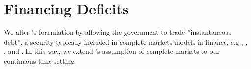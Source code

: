 \documentclass[12pt]{article}
\newcommand{\WJ}[1]{{\textcolor{red}{#1}}}
\newcommand{\TS}[1]{{\textcolor{magenta}{#1}}}
\begin{document}







\section{Financing Deficits}\label{sec:financing}

We alter \citeauthor{LucasStokey1983}'s formulation by 
allowing the government
to trade  ''instantaneous debt'', a security typically  included  in complete markets models in finance,  e.g., \cite{BlackScholes1973}, \cite{merton1973theory}, and \cite{HarrisonandKreps1979}. In this way,
we extend  \citeauthor{LucasStokey1983}'s assumption of complete markets to our continuous time setting.
%
\end{document}
